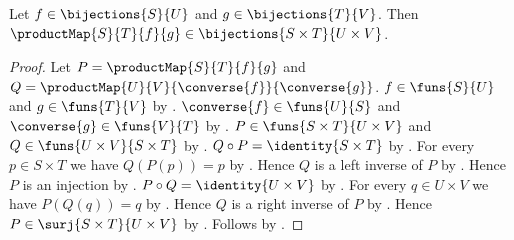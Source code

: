 \begin{theorem}\label{product_map_bijection}
    Let $f\in\bijections{S}{U}$ and $g\in\bijections{T}{V}$.
    Then $\productMap{S}{T}{f}{g}\in\bijections{S\times T}{U\times V}$.
\end{theorem}
\begin{proof}
    Let $P=\productMap{S}{T}{f}{g}$ and
        $Q=\productMap{U}{V}{\converse{f}}{\converse{g}}$.
    $f\in\funs{S}{U}$ and $g\in\funs{T}{V}$ by .
    $\converse{f}\in\funs{U}{S}$ and $\converse{g}\in\funs{V}{T}$ by
        .
    $P\in\funs{S\times T}{U\times V}$ and $Q\in\funs{U\times V}{S\times T}$ by
        .
    $Q\circ P=\identity{S\times T}$ by
        .
    For every $p\in S\times T$ we have $Q(P(p))=p$ by
        .
    Hence $Q$ is a left inverse of $P$ by .
    Hence $P$ is an injection by .
    $P\circ Q=\identity{U\times V}$ by
        .
    For every $q\in U\times V$ we have $P(Q(q))=q$ by
        .
    Hence $Q$ is a right inverse of $P$ by .
    Hence $P\in\surj{S\times T}{U\times V}$ by .
    Follows by .
\end{proof}

